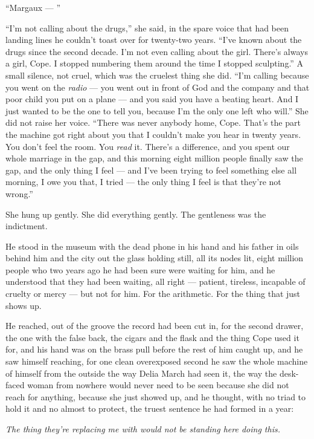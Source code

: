 \documentclass[11pt,openany]{book}
\begin{document}
``Margaux --- ''

``I'm not calling about the drugs,'' she said, in the spare voice that had been landing lines he couldn't toast over for twenty-two years. ``I've known about the drugs since the second decade. I'm not even calling about the girl. There's always a girl, Cope. I stopped numbering them around the time I stopped sculpting.'' A small silence, not cruel, which was the cruelest thing she did. ``I'm calling because you went on the \textit{radio} --- you went out in front of God and the company and that poor child you put on a plane --- and you said you have a beating heart. And I just wanted to be the one to tell you, because I'm the only one left who will.'' She did not raise her voice. ``There was never anybody home, Cope. That's the part the machine got right about you that I couldn't make you hear in twenty years. You don't feel the room. You \textit{read} it. There's a difference, and you spent our whole marriage in the gap, and this morning eight million people finally saw the gap, and the only thing I feel --- and I've been trying to feel something else all morning, I owe you that, I tried --- the only thing I feel is that they're not wrong.''

She hung up gently. She did everything gently. The gentleness was the indictment.

He stood in the museum with the dead phone in his hand and his father in oils behind him and the city out the glass holding still, all its nodes lit, eight million people who two years ago he had been sure were waiting for him, and he understood that they had been waiting, all right --- patient, tireless, incapable of cruelty or mercy --- but not for him. For the arithmetic. For the thing that just shows up.

He reached, out of the groove the record had been cut in, for the second drawer, the one with the false back, the cigars and the flask and the thing Cope used it for, and his hand was on the brass pull before the rest of him caught up, and he saw himself reaching, for one clean overexposed second he saw the whole machine of himself from the outside the way Delia March had seen it, the way the desk-faced woman from nowhere would never need to be seen because she did not reach for anything, because she just showed up, and he thought, with no triad to hold it and no almost to protect, the truest sentence he had formed in a year:

\textit{The thing they're replacing me with would not be standing here doing this.}
\end{document}
